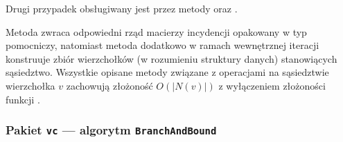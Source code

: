 {{    Drugi przypadek obsługiwany jest przez metody  oraz .

    Metoda  zwraca odpowiedni rząd macierzy incydencji opakowany w typ pomocniczy, natomiast metoda  dodatkowo w ramach wewnętrznej iteracji konstruuje zbiór wierzchołków (w rozumieniu struktury danych) stanowiących sąsiedztwo.
    Wszystkie opisane metody związane z operacjami na sąsiedztwie wierzchołka $v$ zachowują złożoność $O(|N(v)|)$ z wyłączeniem złożoności funkcji .
  }
}
\subsubsection{\textbf{Pakiet \texttt{vc} --- algorytm \texttt{BranchAndBound}}}
\label{ss_internals_BnB}
